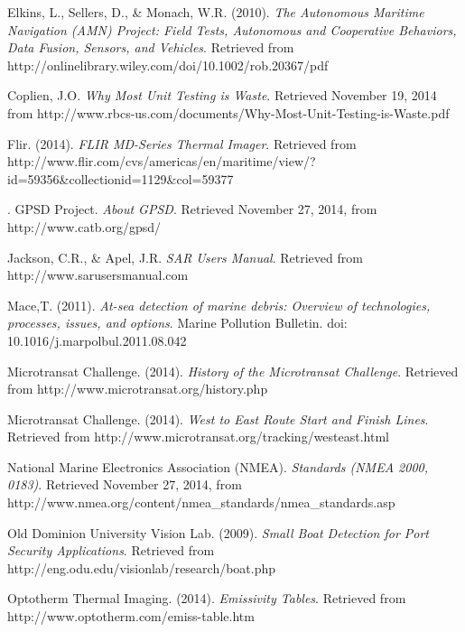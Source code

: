 \begin{thebibliography}{99}


 Elkins, L., Sellers, D., \& Monach, W.R. (2010). \textit{The Autonomous Maritime Navigation (AMN) Project: Field Tests, Autonomous and Cooperative Behaviors, Data Fusion, Sensors, and Vehicles}. Retrieved from http://onlinelibrary.wiley.com/doi/10.1002/rob.20367/pdf

 Coplien, J.O. \textit{Why Most Unit Testing is Waste}. Retrieved November 19, 2014 from http://www.rbcs-us.com/documents/Why-Most-Unit-Testing-is-Waste.pdf

 Flir. (2014). \textit{FLIR MD-Series Thermal Imager}. Retrieved from http://www.flir.com/cvs/americas/en/maritime/view/?id=59356\&collectionid=1129\&col=59377

. GPSD Project. \textit{About GPSD}. Retrieved November 27, 2014, from http://www.catb.org/gpsd/

 Jackson, C.R., \& Apel, J.R. \textit{SAR Users Manual}. Retrieved from http://www.sarusersmanual.com

 Mace,T. (2011). \textit{At-sea detection of marine debris: Overview of technologies, processes, issues, and options}. Marine Pollution Bulletin. doi: 10.1016/j.marpolbul.2011.08.042

 Microtransat Challenge. (2014). \textit{History of the Microtransat Challenge}. Retrieved from http://www.microtransat.org/history.php

 Microtransat Challenge. (2014). \textit{West to East Route Start and Finish Lines}. Retrieved from http://www.microtransat.org/tracking/westeast.html

 National Marine Electronics Association (NMEA). \textit{Standards (NMEA 2000, 0183)}. Retrieved November 27, 2014, from http://www.nmea.org/content/nmea\_standards/nmea\_standards.asp

 Old Dominion University Vision Lab. (2009). \textit{Small Boat Detection for Port Security Applications}. Retrieved from http://eng.odu.edu/visionlab/research/boat.php

 Optotherm Thermal Imaging. (2014). \textit{Emissivity Tables}. Retrieved from http://www.optotherm.com/emiss-table.htm


\end{thebibliography}
